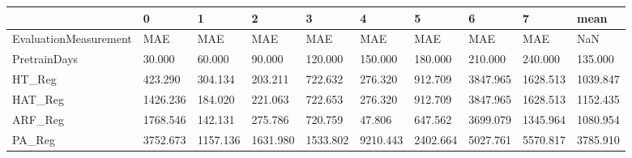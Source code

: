 \begin{tabular}{llllllllll}
\toprule
{} &        0 &        1 &        2 &        3 &        4 &        5 &        6 &        7 &     mean \\
\midrule
EvaluationMeasurement &      MAE &      MAE &      MAE &      MAE &      MAE &      MAE &      MAE &      MAE &      NaN \\
PretrainDays          &   30.000 &   60.000 &   90.000 &  120.000 &  150.000 &  180.000 &  210.000 &  240.000 &  135.000 \\
HT\_Reg                &  423.290 &  304.134 &  203.211 &  722.632 &  276.320 &  912.709 & 3847.965 & 1628.513 & 1039.847 \\
HAT\_Reg               & 1426.236 &  184.020 &  221.063 &  722.653 &  276.320 &  912.709 & 3847.965 & 1628.513 & 1152.435 \\
ARF\_Reg               & 1768.546 &  142.131 &  275.786 &  720.759 &   47.806 &  647.562 & 3699.079 & 1345.964 & 1080.954 \\
PA\_Reg                & 3752.673 & 1157.136 & 1631.980 & 1533.802 & 9210.443 & 2402.664 & 5027.761 & 5570.817 & 3785.910 \\
\bottomrule
\end{tabular}

